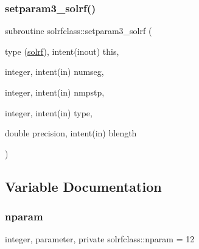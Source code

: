 \mbox{\label{namespacesolrfclass_ae51249f1d976b6ff71436430614a854e}} 
\subsubsection{\texorpdfstring{setparam3\_solrf()}{setparam3\_solrf()}}
{\footnotesize\ttfamily subroutine solrfclass\+::setparam3\+\_\+solrf (\begin{DoxyParamCaption}\item[{type (\mbox{\hyperlink{namespacesolrfclass_structsolrfclass_1_1solrf}{solrf}}), intent(inout)}]{this,  }\item[{integer, intent(in)}]{numseg,  }\item[{integer, intent(in)}]{nmpstp,  }\item[{integer, intent(in)}]{type,  }\item[{double precision, intent(in)}]{blength }\end{DoxyParamCaption})}



\subsection{Variable Documentation}
\mbox{\label{namespacesolrfclass_a01b965e25069cff9fb1797fbbcb9939d}} 
\subsubsection{\texorpdfstring{nparam}{nparam}}
{\footnotesize\ttfamily integer, parameter, private solrfclass\+::nparam = 12\hspace{0.3cm}{\ttfamily [private]}}

